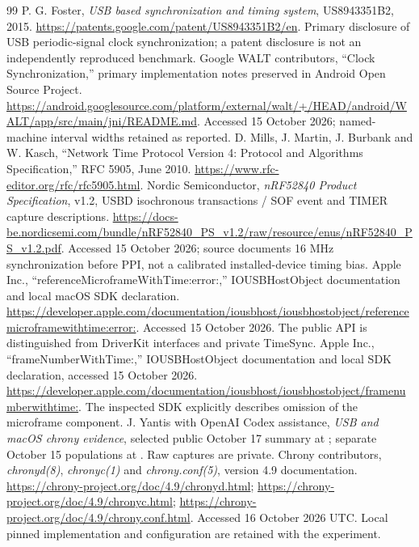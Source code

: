 \documentclass[11pt,letterpaper]{article}
\begin{document}
\begin{thebibliography}{99}
 P. G. Foster, \emph{USB based synchronization and timing system}, US8943351B2, 2015. \url{https://patents.google.com/patent/US8943351B2/en}. Primary disclosure of USB periodic-signal clock synchronization; a patent disclosure is not an independently reproduced benchmark.
 Google WALT contributors, ``Clock Synchronization,'' primary implementation notes preserved in Android Open Source Project. \url{https://android.googlesource.com/platform/external/walt/+/HEAD/android/WALT/app/src/main/jni/README.md}. Accessed 15 October 2026; named-machine interval widths retained as reported.
 D. Mills, J. Martin, J. Burbank and W. Kasch, ``Network Time Protocol Version 4: Protocol and Algorithms Specification,'' RFC 5905, June 2010. \url{https://www.rfc-editor.org/rfc/rfc5905.html}.
 Nordic Semiconductor, \emph{nRF52840 Product Specification}, v1.2, USBD isochronous transactions / SOF event and TIMER capture descriptions. \url{https://docs-be.nordicsemi.com/bundle/nRF52840_PS_v1.2/raw/resource/enus/nRF52840_PS_v1.2.pdf}. Accessed 15 October 2026; source documents 16 MHz synchronization before PPI, not a calibrated installed-device timing bias.
 Apple Inc., ``referenceMicroframeWithTime:error:,'' IOUSBHostObject documentation and local macOS SDK declaration. \url{https://developer.apple.com/documentation/iousbhost/iousbhostobject/referencemicroframewithtime:error:}. Accessed 15 October 2026. The public API is distinguished from DriverKit interfaces and private TimeSync.
 Apple Inc., ``frameNumberWithTime:,'' IOUSBHostObject documentation and local SDK declaration, accessed 15 October 2026. \url{https://developer.apple.com/documentation/iousbhost/iousbhostobject/framenumberwithtime:}. The inspected SDK explicitly describes omission of the microframe component.
 J. Yantis with OpenAI Codex assistance, \emph{USB and macOS chrony evidence}, selected public October 17 summary at ; separate October 15 populations at . Raw captures are private.
 Chrony contributors, \emph{chronyd(8)}, \emph{chronyc(1)} and \emph{chrony.conf(5)}, version 4.9 documentation. \url{https://chrony-project.org/doc/4.9/chronyd.html}; \url{https://chrony-project.org/doc/4.9/chronyc.html}; \url{https://chrony-project.org/doc/4.9/chrony.conf.html}. Accessed 16 October 2026 UTC. Local pinned implementation and configuration are retained with the experiment.
\end{thebibliography}
\end{document}
